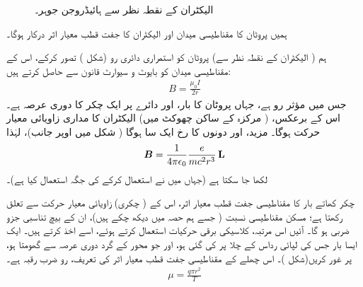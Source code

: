 \begin{figure}
\centering
{}
\caption{الیکٹران کے نقطہ نظر سے ہائیڈروجن جوہر۔}
\label{شکل_غیر_تابع_اضطراب_جوہر_الیکٹران_نقطہ_نظر}
\end{figure}

ہمیں پروٹان کا مقناطیسی میدان  اور الیکٹران کا جفت قطب معیار اثر  درکار ہوگا۔ 

\quad
{} ہم ( الیکٹران کے نقطہ نظر سے) پروٹان کو استمراری دائری رو (شکل ) تصور کرکے، اس کے مقناطیسی میدان کو بایوٹ و سيوارٹ قانون سے حاصل کرتے ہیں:
\begin{align*} 
B = \frac{\mu_0 I}{2r}
\end{align*}
جس میں مؤثر رو  ہے، جہاں  پروٹان کا بار، اور  دائرے پر ایک چکر کا دوری عرصہ ہے۔ اس کے برعکس،  ( مرکزہ کے ساکن چھوکٹ میں) الیکٹران کا مداری زاویائی معیار حرکت ہوگا۔ مزید،  اور  دونوں کا رخ ایک سا ہوگا ( شکل  میں اوپر جانب)، لہٰذا
\begin{align}\label{مساوات_غیر_مضطرب_اندرونی_مقناطیسی_میدان}
{\ensuremath{{\boldsymbol{B}}}} = \frac{1}{4 \pi \epsilon_0} \frac{e}{mc^2 r^3} \operatorname{\mathbf{L}}
\end{align}
لکھا جا سکتا ہے (جہاں میں نے  استعمال کرکے  کی جگہ  استعمال کیا ہے)۔ 

\quad
{} چکر کھاتے بار کا مقناطیسی جفت قطب معیار اثر، اس کے ( چکری) زاویائی معیار حرکت سے تعلق رکھتا ہے؛ مسکن مقناطیسی نسبت ( جسے ہم حصہ  میں دیکھ چکے ہیں)، ان کے بیچ تناسبی جزو ضربی ہو گا۔ آئیں اس مرتبہ، کلاسیکی برقی حرکیات استعمال کرتے ہوئے، اسے اخذ کرتے ہیں۔ ایک ایسا بار  جس کی لپائی رداس  کے چلا پر کی گئی ہو، اور جو محور کے گرد دوری عرصہ  سے گھومتا ہو، پر غور کریں(شکل )۔ اس چھلے کے مقناطیسی جفت قطب معیار اثر کی تعریف، رو  ضرب رقبہ  ہے۔
\begin{align*}
\mu = \frac{q \pi r^2}{T}
\end{align*}

